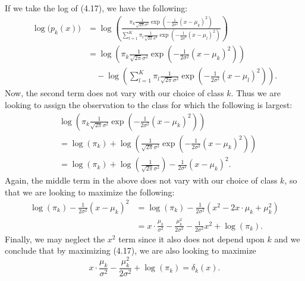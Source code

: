 If we take the log of (4.17), we have the following:
\begin{equation*}
    \begin{split}
        \log{\bigl(p_k(x)\bigr)} &= \log{\left(\frac{\pi_k \frac{1}{\sqrt{2\pi}\sigma^2}
                    \exp{\left(-\frac{1}{2\sigma^2}{(x - \mu_k)}^2\right)}}
                    {\sum_{l=1}^K{\pi_l \frac{1}{\sqrt{2\pi}\sigma^2}
        \exp{\left(-\frac{1}{2\sigma^2}{(x - \mu_l)}^2\right)}}}\right)} \\
        &= \log{\left(\pi_k \frac{1}{\sqrt{2\pi}\sigma^2}
        \exp{\left(-\frac{1}{2\sigma^2}{(x - \mu_k)}^2\right)}\right)} \\
        &\quad - \log{\left(\sum_{l=1}^K{\pi_l \frac{1}{\sqrt{2\pi}\sigma^2}
        \exp{\left(-\frac{1}{2\sigma^2}{(x - \mu_l)}^2\right)}}\right)}.
    \end{split}
\end{equation*}
Now, the second term does not vary with our choice of class $k$. Thus we are
looking to assign the observation to the class for which the following is
largest:
\begin{equation*}
    \begin{split}
        & \log{\left(\pi_k \frac{1}{\sqrt{2\pi}\sigma^2}
        \exp{\left(-\frac{1}{2\sigma^2}{(x - \mu_k)}^2\right)}\right)} \\
        &= \log{(\pi_k)} + \log{\left(\frac{1}{\sqrt{2\pi}\sigma^2}
        \exp{\left(-\frac{1}{2\sigma^2}{(x - \mu_k)}^2\right)}\right)} \\
        &= \log{(\pi_k)} + \log{\left(\frac{1}{\sqrt{2\pi}\sigma^2}\right)}
        - \frac{1}{2\sigma^2}{(x - \mu_k)}^2.
    \end{split}
\end{equation*}
Again, the middle term in the above does not vary with our choice of class
$k$, so that we are looking to maximize the following:
\begin{equation*}
    \begin{split}
        \log{(\pi_k)} - \frac{1}{2\sigma^2}{(x - \mu_k)}^2 &= \log{(\pi_k)}
        - \frac{1}{2\sigma^2}(x^2 - 2 x \cdot \mu_k + \mu_k^2) \\
        &= x \cdot \frac{\mu_k}{\sigma^2} - \frac{\mu_k^2}{2\sigma^2}
        - \frac{1}{2\sigma^2}x^2 + \log{(\pi_k)}.
    \end{split}
\end{equation*}
Finally, we may neglect the $x^2$ term since it also does not depend upon $k$
and we conclude that by maximizing (4.17), we are also looking to maximize
\[
    x \cdot \frac{\mu_k}{\sigma^2} - \frac{\mu_k^2}{2\sigma^2} + \log{(\pi_k)}
    = \delta_k(x).
\]

